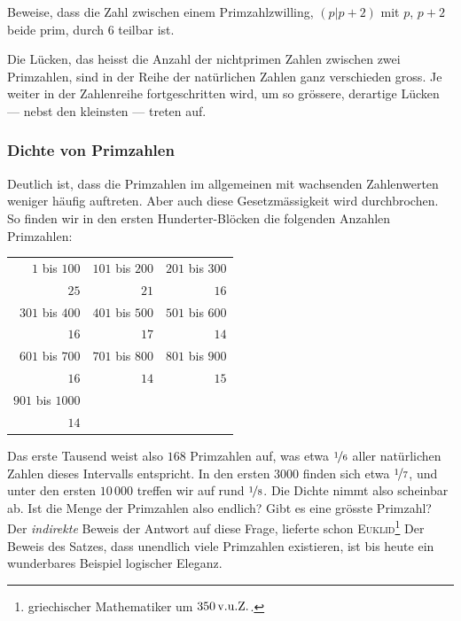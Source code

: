 \documentclass[%
11pt,%
twoside,%
titlepage,%
german,%
headsepline%
]{scrartcl}
\newcommand{\spaltenheight}{\rule{0mm}{3ex}}
\newcommand{\spaltensep}{\\[1ex]}
\begin{document}
\begin{ueb}[Primzahlzwillinge]
Beweise, dass die Zahl zwischen einem Primzahlzwilling, $(p|p+2)$ mit $p$, $p+2$ beide prim, durch $6$ teilbar ist.
\end{ueb}

Die Lücken, das heisst die Anzahl der nichtprimen Zahlen zwischen zwei Primzahlen, sind in der Reihe der natürlichen Zahlen ganz verschieden gross. Je weiter in der Zahlenreihe fortgeschritten wird, um so grössere, derartige Lücken --- nebst den kleinsten --- treten auf.

\subsubsection{Dichte von Primzahlen}

Deutlich ist, dass die Primzahlen im allgemeinen mit wachsenden Zahlenwerten weniger häufig auftreten. Aber auch diese Gesetzmässigkeit wird durchbrochen. So finden wir in den ersten Hunderter-Blöcken die folgenden Anzahlen Primzahlen:\\
\begin{center}
\begin{tabular}{rrr}
\rowcolor{Gray}\spaltenheight $1$ bis $100$ & $101$ bis $200$ & $201$ bis $300$\spaltensep
\rowcolor{lightyellow}\spaltenheight $25$ & $21$ & $16$\spaltensep
\rowcolor{Gray}\spaltenheight $301$ bis $400$ & $401$ bis $500$ & $501$ bis $600$\spaltensep
\rowcolor{lightyellow}\spaltenheight $16$ & $17$ & $14$\spaltensep
\rowcolor{Gray}\spaltenheight $601$ bis $700$ & $701$ bis $800$ & $801$ bis $900$\spaltensep
\rowcolor{lightyellow}\spaltenheight $16$ & $14$ & $15$\spaltensep
\rowcolor{Gray}\spaltenheight $901$ bis $1000$ & &\spaltensep
\rowcolor{lightyellow}\spaltenheight $14$ & &\spaltensep
\end{tabular}
\end{center}
Das erste Tausend weist also $168$ Primzahlen auf, was etwa $\nicefrac{1}{6}$ aller natürlichen Zahlen dieses Intervalls entspricht. In den ersten $3000$ finden sich etwa $\nicefrac{1}{7}$, und unter den ersten $10\,000$ treffen wir auf rund $\nicefrac{1}{8}$. Die Dichte nimmt also scheinbar ab.
Ist die Menge der Primzahlen also endlich? Gibt es eine grösste Primzahl?
Der \emph{indirekte} Beweis der Antwort auf diese Frage, lieferte schon \textsc{Euklid}\footnote{griechischer Mathematiker um $\unit[350]{v.u.Z.}$.}
Der Beweis des Satzes, dass unendlich viele Primzahlen existieren, ist bis heute ein wunderbares Beispiel logischer Eleganz.
 
\end{document}
